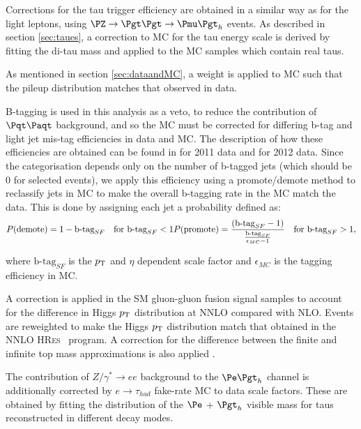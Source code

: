 Corrections for the tau trigger efficiency are 
obtained in a similar way as for the light leptons, using $\PZ\to\Pgt\Pgt\to\Pmu\Pgt_{h}$ events. As described in
section \ref{sec:taues}, a correction to \ac{MC} for the tau energy
scale is derived by fitting the di-tau mass and applied to the \ac{MC} samples
which contain real taus.

As mentioned in section \ref{sec:dataandMC}, a weight is applied to \ac{MC} such
that the pileup distribution matches that observed in data.

B-tagging is used in this analysis as a veto, to reduce the contribution of
$\ttbar$ background, and so the \ac{MC} must be corrected for differing b-tag
and light jet mis-tag efficiencies in data and \ac{MC}. The description of how
these efficiencies are obtained can be found in \cite{CMS-PAS-BTV-11-004} for
2011 data and \cite{CMS-PAS-BTV-13-001} for 2012 data. Since the categorisation 
depends only on the number of b-tagged jets (which should be 0 for selected events), 
we apply this efficiency using a promote/demote method to reclassify jets in \ac{MC} 
to make the overall b-tagging rate in the \ac{MC} match the data. This is done
by assigning each jet a probability defined as:
\begin{equation}
P(\text{demote})  = 1 - \text{b-tag}_{SF} \quad \text{for } \text{b-tag}_{SF} < 1 \\
P(\text{promote}) = \frac{\left(\text{b-tag}_{SF} -
1\right)}{\frac{\text{b-tag}_{SF}}{\epsilon_{MC}-1} } \quad \text{for } \text{b-tag}_{SF} > 1 ,
\end{equation}

where $\text{b-tag}_{SF}$ is the $p_{\mathrm{T}}$ and $\eta$ dependent scale factor and
$\epsilon_{MC}$ is the tagging efficiency in \ac{MC}.

A correction is applied in the \ac{SM} gluon-gluon fusion signal
samples to account for the difference in Higgs $p_{\mathrm{T}}$ distribution at \ac{NNLO}
compared with \ac{NLO}. Events are reweighted to make the Higgs $p_{\mathrm{T}}$
distribution match that obtained in the \ac{NNLO} \textsc{HRes}~\cite{deFlorian:2012mx} program. 
A correction for the difference between the finite and infinite top
mass approximations is also applied \cite{Grazzini:2013mca}.


The contribution of $Z/\gamma^{*} \to ee$ background to the $\etau$ channel
is additionally corrected by $e \to \tau_{had}$ fake-rate \ac{MC} to data
scale factors. These are obtained by fitting the distribution of the $\Pe$ +
$\Pgt_{h}$ visible mass for taus reconstructed in different decay modes. 


